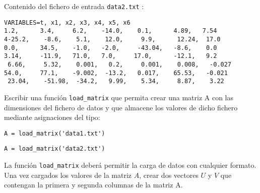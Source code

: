 \documentclass[12pt,spanish]{article}
\begin{document}
\begin{itemize}
\vspace{1cm}

Contenido del fichero de entrada \verb|data2.txt| :

\begin{verbatim}
VARIABLES=t, x1, x2, x3, x4, x5, x6
1.2,      3.4,     6.2,    -14.0,    0.1,      4.89,   7.54
4-25.2,    -8.6,    5.1,    12.0,     9.9,      12.24,  17.0
0.0,      34.5,    -1.0,   -2.0,     -43.04,   -8.6,    0.0
3.14,     -11.9,   71.0,   7.0,     17.0,      -12.1,   9.2
 6.66,     5.32,    0.001,   0.2,     0.001,    0.008,   -0.027
54.0,     77.1,    -9.002,  -13.2,   0.017,    65.53,   -0.021
 23.04,    -51.98,  -34.2,   9.99,    5.34,     8.87,    3.22 
\end{verbatim}

\vspace{0.5cm}


Escribir una función \verb|load_matrix| que permita crear una matriz A con las dimensiones 
del fichero de datos y que almacene los valores de dicho fichero mediante 
 asignaciones del tipo: 
 
 \hspace{2cm} \verb|A = load_matrix('data1.txt')| 
 
 \hspace{2cm}  \verb|A = load_matrix('data2.txt')|

La función   \verb|load_matrix| deberá permitir la carga de datos con cualquier formato. 
Una vez cargados los valores de la matriz $ A $, crear dos vectores $ U$ y $V$  que contengan la primera y segunda columnas de la matriz A. 
     

	
	
	
	
	
	

\end{itemize}
\end{document}

